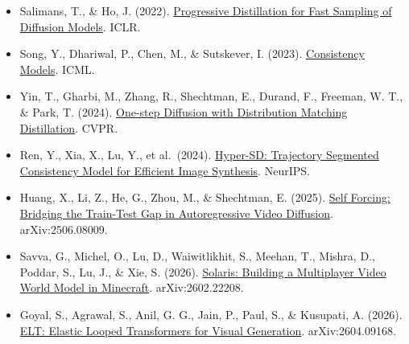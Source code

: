 \vspace{0.25em}
\begin{itemize}
\tightlist
\item
  Salimans, T., \& Ho, J. (2022). \href{https://arxiv.org/abs/2202.00512}{Progressive Distillation for Fast Sampling of Diffusion Models}. ICLR.
\item
  Song, Y., Dhariwal, P., Chen, M., \& Sutskever, I. (2023). \href{https://arxiv.org/abs/2303.01469}{Consistency Models}. ICML.
\item
  Yin, T., Gharbi, M., Zhang, R., Shechtman, E., Durand, F., Freeman, W. T., \& Park, T. (2024). \href{https://arxiv.org/abs/2311.18828}{One-step Diffusion with Distribution Matching Distillation}. CVPR.
\item
  Ren, Y., Xia, X., Lu, Y., et al.~(2024). \href{https://arxiv.org/abs/2404.13686}{Hyper-SD: Trajectory Segmented Consistency Model for Efficient Image Synthesis}. NeurIPS.
\item
  Huang, X., Li, Z., He, G., Zhou, M., \& Shechtman, E. (2025). \href{https://arxiv.org/abs/2506.08009}{Self Forcing: Bridging the Train-Test Gap in Autoregressive Video Diffusion}. arXiv:2506.08009.
\item
  Savva, G., Michel, O., Lu, D., Waiwitlikhit, S., Meehan, T., Mishra, D., Poddar, S., Lu, J., \& Xie, S. (2026). \href{https://arxiv.org/abs/2602.22208}{Solaris: Building a Multiplayer Video World Model in Minecraft}. arXiv:2602.22208.
\item
  Goyal, S., Agrawal, S., Anil, G. G., Jain, P., Paul, S., \& Kusupati, A. (2026). \href{https://arxiv.org/abs/2604.09168}{ELT: Elastic Looped Transformers for Visual Generation}. arXiv:2604.09168.
\end{itemize}

\clearpage
